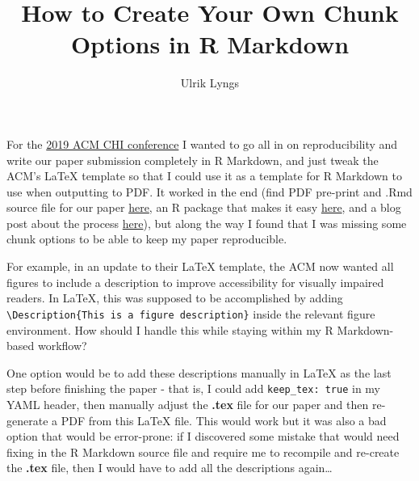\documentclass[sigchi, ]{acmart}
\begin{document}
\title[]{How to Create Your Own Chunk Options in R Markdown}



\author{Ulrik Lyngs}
\email{}

\renewcommand{\shortauthors}{}


\begin{abstract}

\end{abstract}


\keywords{}



\maketitle

For the \href{http://chi2019.acm.org}{2019 ACM CHI conference} I wanted to go all in on reproducibility and write our paper submission completely in R Markdown, and just tweak the ACM's LaTeX template so that I could use it as a template for R Markdown to use when outputting to PDF.
It worked in the end (find PDF pre-print and .Rmd source file for our paper \href{https://osf.io/zyj4h/}{here}, an R package that makes it easy \href{https://github.com/ulyngs/chi-proc-rmd-template}{here}, and a blog post about the process \href{https://ulyngs.github.io/blog/posts/2018-10-28-how-to-write-acm-articles-with-r-markdown/}{here}), but along the way I found that I was missing some chunk options to be able to keep my paper reproducible.

For example, in an update to their LaTeX template, the ACM now wanted all figures to include a description to improve accessibility for visually impaired readers.
In LaTeX, this was supposed to be accomplished by adding \texttt{\textbackslash{}Description\{This\ is\ a\ figure\ description\}} inside the relevant figure environment.
How should I handle this while staying within my R Markdown-based workflow?

One option would be to add these descriptions manually in LaTeX as the last step before finishing the paper - that is, I could add \texttt{keep\_tex:\ true} in my YAML header, then manually adjust the \textbf{.tex} file for our paper and then re-generate a PDF from this LaTeX file.
This would work but it was also a bad option that would be error-prone: if I discovered some mistake that would need fixing in the R Markdown source file and require me to recompile and re-create the \textbf{.tex} file, then I would have to add all the descriptions again\ldots{}
\end{document}
